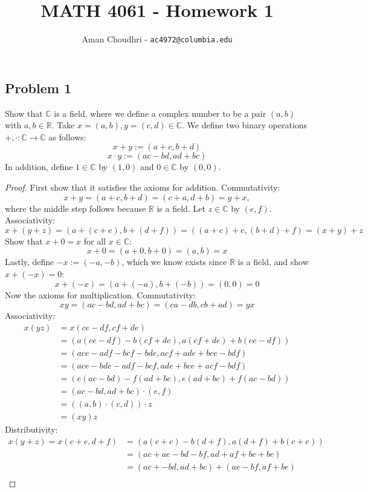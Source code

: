 \documentclass[11pt, oneside]{article}
\title{MATH 4061 - Homework 1}
\author{Aman Choudhri - \texttt{ac4972@columbia.edu}}
\newcommand{\R}{\mathbb{R}}
\newcommand{\C}{\mathbb{C}}
\begin{document}
\maketitle
\subsection*{Problem 1}
Show that $\C$ is a field, where we define a complex number to be a pair $(a, b)$ with $a, b \in \R$.
Take $x = (a, b), y = (c, d) \in \C$. We define two binary operations $+, \cdot: \C \rightarrow \C$ as follows:
$$
x + y := (a + c, b + d)
$$
$$
x \cdot y := (ac - bd, ad + bc)
$$
In addition, define $1 \in \C$ by $(1, 0)$ and $0 \in \C$ by $(0, 0)$.
\begin{proof}
    First show that it satisfies the axioms for addition. Commutativity:
    $$x + y = (a + c, b + d) = (c + a, d + b) = y + x,$$
    where the middle step follows because $\R$ is a field. Let $z \in \C$ by $(e, f)$. Associativity:
    $$x + (y + z) = (a + (c + e), b + (d + f)) = ((a + c) + e, (b + d) + f) = (x + y) + z$$
    Show that $x + 0 = x$ for all $x \in \C$:
    $$x + 0 = (a + 0, b + 0) = (a, b) = x$$
    Lastly, define $-x := (-a, -b)$, which we know exists since $\R$ is a field, and show $x + (-x) = 0$:
    $$x + (-x) = (a + (-a), b + (-b)) = (0, 0) = 0$$
    Now the axioms for multiplication. Commutativity:
    $$xy = (ac - bd, ad + bc) = (ca - db, cb + ad) = yx$$
    Associativity:
    \begin{align*}
        x(yz) &= x(ce - df, cf + de) \\
        &= (a(ce - df) - b(cf + de), a(cf + de) + b(ce - df)) \\
        &= (ace - adf - bcf - bde, acf + ade + bce - bdf) \\
        &= (ace - bde - adf - bcf , ade + bce + acf - bdf) \\
        &= (e(ac - bd) - f(ad + bc), e(ad + bc) + f(ac - bd)) \\
        &= (ac - bd, ad + bc) \cdot (e, f) \\
        &= ((a, b) \cdot (c, d)) \cdot z \\
        &= (xy)z
    \end{align*}
    Distributivity:
    \begin{align*}
        x(y + z) = x(c + e, d + f) &= (a(c + e) - b(d + f), a(d+f) + b(c + e)) \\
        &= (ac + ae - bd - bf, ad + af + bc + be) \\
        &= (ac + -bd, ad + bc) + (ae - bf, af + be) \\

\end{align*}
\end{proof}
\end{document}
